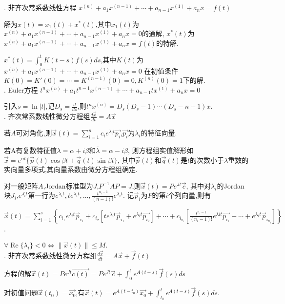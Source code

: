 \documentclass[UTF8]{ctexart}
\begin{document}
. 非齐次常系数线性方程
$x^{(n)}+a_1x^{(n-1)}+\cdots +a_{n-1}x^{(1)}+a_nx=f(t)$ \par 
解为$x(t)=x_1(t)+x^*(t)$,其中$x_1(t)$为$x^{(n)}+a_1x^{(n-1)}+\cdots +a_{n-1}x^{(1)}+a_nx=0$的通解,
$x^*(t)$为$x^{(n)}+a_1x^{(n-1)}+\cdots +a_{n-1}x^{(1)}+a_nx=f(t)$的特解. \par 
$x^*(t)=\int _0^t K(t-s)f(s)ds$,其中$K(t)$为$x^{(n)}+a_1x^{(n-1)}+\cdots +a_{n-1}x^{(1)}+a_nx=0$
在初值条件$K(0)=K'(0)=\cdots =K^{(n-1)}(0)=0, K^{(n)}(0)=1$下的解.
~\\

. Euler方程
$t^nx^{(n)}+a_1t^{n-1}x^{(n-1)}+\cdots +a_{n-1}tx^{(1)}+a_nx=0$ \par 
引入$s=\ln |t|$,记$D_s=\frac{d}{ds}$,则$t^n x^{(n)}=D_s(D_s-1)\cdots (D_s-n+1)x$.
~\\

. 齐次常系数线性微分方程组$\frac{d\vec{x}}{dt}=A\vec{x} $ \par 

若$A$可对角化,则$\vec{x}(t)=\sum _{i=1}^n c_i e^{\lambda_i t}\vec{p_i}$,$\vec{p_i}$为$\lambda_i$的特征向量. \par 
若A有复数特征值$\lambda=\alpha+i\beta$和$\bar{\lambda}=\alpha-i\beta$,
则方程组实值解形如$\vec{x}=e^{\alpha t}\{\vec{p}(t) \cos \beta t+\vec{q}(t) \sin \beta t\}$,
其中$\vec{p}(t)$和$\vec{q}(t)$是$t$的次数小于$\lambda$重数的实向量多项式,其向量系数由微分方程组确定. \par 

对一般矩阵$A$,Jordan标准型为$J$,$P^{-1}AP=J$,则$\vec{x}(t)=Pe^{Jt}\vec{c}$,
其中对$\lambda_i$的Jordan块$J_i$,$e^{J_it}$第一行为$e^{\lambda_it},te^{\lambda_it},\dots ,\frac{t^{n_i-1}}{(n-1)!}e^{\lambda_it}$.
记$\vec{p}_i$为$P$的第$i$个列向量,则有 \par 
$\vec{x}(t)= \sum_{i=1}^{s}\left\{c_{i_1}e^{\lambda_it} \vec{p}_{i_1}+c_{i_2}\left[te^{\lambda_it} \vec{p}_{i_1}+e^{\lambda_it}\vec{p_{i_2}}\right]
+\cdots+c_{i_{n_{i}}}\left[\frac{t^{n_{i}-1}}{\left(n_{i}-1\right)!} e^{\lambda i t} \vec{p_{i_1}}+\cdots+e^{\lambda_it} \vec{p}_{i_{n_{i}}}\right]\right\}$.\par 
$\forall \operatorname{Re}\{\lambda_i\}<0 \Leftrightarrow \|\vec{x}(t)\| \leq M$.
~\\

. 非齐次常系数线性微分方程组$\frac{d\vec{x}}{dt}=A\vec{x} +\vec{f}(t)$ \par 
方程的解$\vec{x}(t)=Pe^{Jt}\vec{c(t)}=Pe^{Jt}\vec{c}+\int_{0}^te^{A(t-s)}\vec{f}(s)ds$ \par 
对初值问题$\vec{x}(t_0)=\vec{x_0}$,有$\vec{x}(t)=e^{A(t-t_0)}\vec{x_0}+\int_{t_0}^te^{A(t-s)}\vec{f}(s)ds$.
~\\
\end{document}
